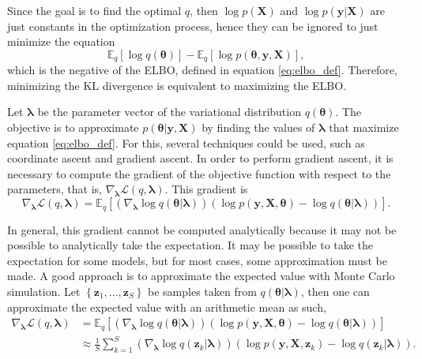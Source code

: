 Since the goal is to find the optimal $q$, then $\log p(\boldsymbol{X})$ and $\log p(\boldsymbol{y} | \boldsymbol{X})$ are just constants in the optimization process, hence they can be ignored to just minimize the equation
\begin{equation}
  \mathbb{E}_q \left[ \log  q(\boldsymbol{\theta}) \right] - \mathbb{E}_q \left[ \log p(\boldsymbol{\theta}, \boldsymbol{y}, \boldsymbol{X}) \right],
\end{equation}
which is the negative of the ELBO, defined in equation \eqref{eq:elbo_def}. Therefore, minimizing the KL divergence is equivalent to maximizing the ELBO.

Let $\boldsymbol{\lambda}$ be the parameter vector of the variational distribution $q(\boldsymbol{\theta})$. The objective is to approximate $p(\boldsymbol{\theta} | \boldsymbol{y}, \boldsymbol{X})$ by finding the values of $\boldsymbol{\lambda}$ that maximize equation \eqref{eq:elbo_def}. For this, several techniques could be used, such as coordinate ascent and gradient ascent. In order to perform gradient ascent, it is necessary to compute the gradient of the objective function with respect to the parameters, that is, $\nabla_{\boldsymbol{\lambda}} \mathcal{L}(q, \boldsymbol{\lambda})$. This gradient is
\begin{equation}
  \label{eq:ELBO_gradient}
  \nabla_{\boldsymbol{\lambda}} \mathcal{L}(q, \boldsymbol{\lambda}) =
  \mathbb{E}_q \left[ \left( \nabla_{\boldsymbol{\lambda}} \log q(\boldsymbol{\theta} | \boldsymbol{\lambda}) \right) \left( \log p(\boldsymbol{y}, \boldsymbol{X}, \boldsymbol{\theta}) - \log q(\boldsymbol{\theta} | \boldsymbol{\lambda}) \right) \right].
\end{equation}

In general, this gradient cannot be computed analytically because it may not be possible to analytically take the expectation. It may be possible to take the expectation for some models, but for most cases, some approximation must be made. A good approach is to approximate the expected value with Monte Carlo simulation. Let $\left\{ \boldsymbol{z}_1, ..., \boldsymbol{z}_S \right\}$ be samples taken from $q(\boldsymbol{\theta} | \boldsymbol{\lambda})$, then one can approximate the expected value with an arithmetic mean as such,
\begin{equation}
  \begin{split}
  \nabla_{\boldsymbol{\lambda}} \mathcal{L}(q, \boldsymbol{\lambda}) &=
  \mathbb{E}_q \left[ \left( \nabla_{\boldsymbol{\lambda}} \log q(\boldsymbol{\theta} | \boldsymbol{\lambda}) \right) \left( \log p(\boldsymbol{y}, \boldsymbol{X}, \boldsymbol{\theta}) - \log q(\boldsymbol{\theta} | \boldsymbol{\lambda}) \right) \right] \\
  & \approx \frac{1}{S} \sum_{k = 1}^S \left( \nabla_{\boldsymbol{\lambda}} \log q(\boldsymbol{z}_k | \boldsymbol{\lambda}) \right) \left( \log p(\boldsymbol{y}, \boldsymbol{X}, \boldsymbol{z}_k) - \log q(\boldsymbol{z}_k | \boldsymbol{\lambda}) \right).
  \end{split}
\end{equation}

